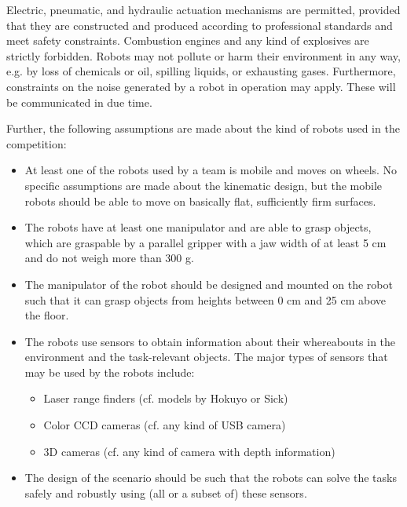 Electric, pneumatic, and hydraulic actuation mechanisms are permitted, provided that they are constructed and produced according to professional standards and meet safety constraints. Combustion engines and any kind of explosives are strictly forbidden. Robots may not pollute or harm their environment in any way, e.g. by loss of chemicals or oil, spilling liquids, or exhausting gases. Furthermore, constraints on the noise generated by a robot in operation may apply. These will be communicated in due time.
\par
Further, the following assumptions are made about the kind of robots used in the competition:
\par
\begin{itemize}

	\item At least one of the robots used by a team is mobile and moves on wheels. No specific assumptions are made about the kinematic design, but the mobile robots should be able to move on basically flat, sufficiently firm surfaces.
	\item The robots have at least one manipulator and are able to grasp objects, which are graspable by a parallel gripper with a jaw width of at least 5 cm and do not weigh more than 300 g.
	\item The manipulator of the robot should be designed and mounted on the robot such that it can grasp objects from heights between 0 cm and 25 cm above the floor.
	\item The robots use sensors to obtain information about their whereabouts in the environment and the task-relevant objects. The major types of sensors that may be used by the robots include:
	\begin{itemize}
		\item Laser range finders (cf. models by Hokuyo or Sick)
		\item Color CCD cameras (cf. any kind of USB camera)
		\item 3D cameras (cf. any kind of camera with depth information)
	\end{itemize}
	\item The design of the scenario should be such that the robots can solve the tasks safely and robustly using (all or a subset of) these sensors.

\end{itemize}

